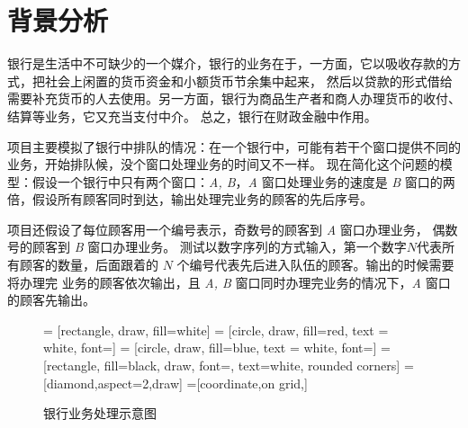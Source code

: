 
\chapter{背景分析}

银行是生活中不可缺少的一个媒介，银行的业务在于，一方面，它以吸收存款的方式，把社会上闲置的货币资金和小额货币节余集中起来，%
然后以贷款的形式借给需要补充货币的人去使用。另一方面，银行为商品生产者和商人办理货币的收付、结算等业务，它又充当支付中介。%
总之，银行在财政金融中作用。

项目主要模拟了银行中排队的情况：在一个银行中，可能有若干个窗口提供不同的业务，开始排队候，没个窗口处理业务的时间又不一样。%
现在简化这个问题的模型：假设一个银行中只有{\kaishu 两个}窗口：\textsl{A, B}，\textsl{A} 窗口处理业务的速度是 \textsl{B}%
窗口的{\kaishu 两倍}，假设所有顾客{\kaishu 同时}到达，输出处理完业务的顾客的先后序号。

项目还假设了每位顾客用一个编号表示，奇数号的顾客到 \textsl{A} 窗口办理业务，%
偶数号的顾客到 \textsl{B} 窗口办理业务。
测试以数字序列的方式输入，第一个数字$N$代表所有顾客的数量，后面跟着的 $N$ 个编号代表先后进入队伍的顾客。输出的时候需要将办理完%
业务的顾客依次输出，且 \textsl{A, B} 窗口同时办理完业务的情况下，\textsl{A} 窗口的顾客先输出。\vspace{0.7 cm}\\

{
    \begin{figure}[H]
        \centering
         = [rectangle, draw, fill=white]
         = [circle, draw, fill=red, text = white, font={\bfseries}]
         = [circle, draw, fill=blue, text = white, font={\bfseries}]
         = [rectangle, fill=black, draw, font={\bfseries \Large}, text=white, rounded corners]
	    =[diamond,aspect=2,draw]  
        =[coordinate,on grid,] 
        \caption{银行业务处理示意图}
    \end{figure}
}

